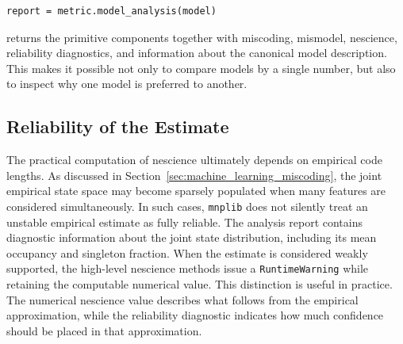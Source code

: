 \begin{sourcecode}
{\scriptsize
\begin{verbatim}
report = metric.model_analysis(model)
\end{verbatim}}
\end{sourcecode}

returns the primitive components together with miscoding, mismodel, nescience, reliability diagnostics, and information about the canonical model description. This makes it possible not only to compare models by a single number, but also to inspect why one model is preferred to another.


\subsection*{Reliability of the Estimate}

The practical computation of nescience ultimately depends on empirical code lengths. As discussed in Section~\ref{sec:machine_learning_miscoding}, the joint empirical state space may become sparsely populated when many features are considered simultaneously. In such cases, \texttt{mnplib} does not silently treat an unstable empirical estimate as fully reliable. The analysis report contains diagnostic information about the joint state distribution, including its mean occupancy and singleton fraction. When the estimate is considered weakly supported, the high-level nescience methods issue a \texttt{RuntimeWarning} while retaining the computable numerical value. This distinction is useful in practice. The numerical nescience value describes what follows from the empirical approximation, while the reliability diagnostic
indicates how much confidence should be placed in that approximation.

